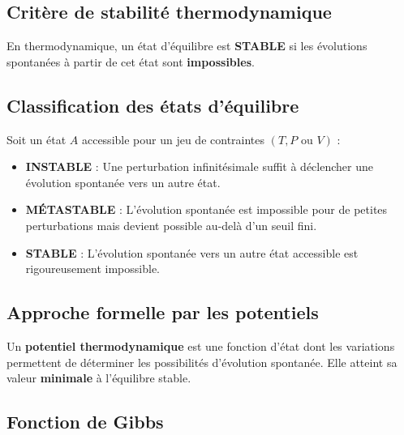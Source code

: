 \documentclass[french]{yLectureNote}
\begin{document}
\subsection{Critère de stabilité thermodynamique}

\begin{definition}
En thermodynamique, un état d'équilibre est \textbf{STABLE} si les évolutions spontanées à partir de cet état sont \textbf{impossibles}. 
\end{definition}


\subsection{Classification des états d'équilibre}

\begin{definition}
Soit un état $A$ accessible pour un jeu de contraintes $(T, P \text{ ou } V)$ :
\begin{itemize}
    \item \textbf{INSTABLE} : Une perturbation infinitésimale suffit à déclencher une évolution spontanée vers un autre état.
    \item \textbf{MÉTASTABLE} : L'évolution spontanée est impossible pour de petites perturbations mais devient possible au-delà d'un seuil fini.
    \item \textbf{STABLE} : L'évolution spontanée vers un autre état accessible est rigoureusement impossible.
\end{itemize}
\end{definition}


\subsection{Approche formelle par les potentiels}

\begin{definition}
Un \textbf{potentiel thermodynamique} est une fonction d'état dont les variations permettent de déterminer les possibilités d'évolution spontanée. Elle atteint sa valeur \textbf{minimale} à l'équilibre stable.
\end{definition}


\subsection{Fonction de Gibbs}
\end{document}
